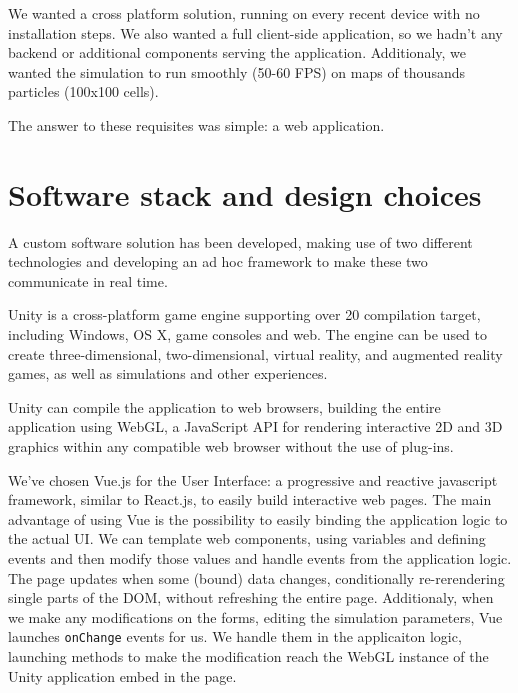 We wanted a cross platform solution, running on every recent device with no installation steps.
We also wanted a full client-side application, so we hadn't any backend or additional components serving the application. Additionaly, we wanted the simulation to run smoothly (50-60 FPS) on maps of thousands particles (100x100 cells).

The answer to these requisites was simple: a web application.

\section{Software stack and design choices}

A custom software solution has been developed, making use of two different technologies and developing an ad hoc framework to make these two communicate in real time.

Unity is a cross-platform game engine supporting over 20 compilation target, including Windows, OS X, game consoles and web. The engine can be used to create three-dimensional, two-dimensional, virtual reality, and augmented reality games, as well as simulations and other experiences.

Unity can compile the application to web browsers, building the entire application using WebGL, a JavaScript API for rendering interactive 2D and 3D graphics within any compatible web browser without the use of plug-ins.

We've chosen Vue.js for the User Interface: a progressive and reactive javascript framework, similar to React.js, to easily build interactive web pages. The main advantage of using Vue is the possibility to easily binding the application logic to the actual UI. We can template web components, using variables and defining events and then modify those values and handle events from the application logic. The page updates when some (bound) data changes, conditionally re-rerendering single parts of the DOM, without refreshing the entire page. Additionaly, when we make any modifications on the forms, editing the simulation parameters, Vue launches \texttt{onChange} events for us. We handle them in the applicaiton logic, launching methods to make the modification reach the WebGL instance of the Unity application embed in the page.

